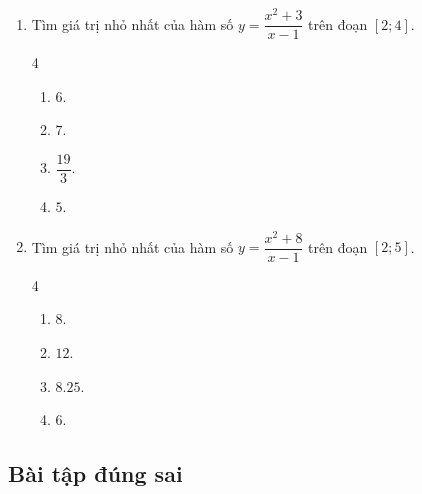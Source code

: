 \documentclass[12pt]{article}
\begin{document}
\begin{enumerate}[label=\textbf{Câu \arabic*.}]
		\item Tìm giá trị nhỏ nhất của hàm số $y = \dfrac{x^2 + 3}{x - 1}$ trên đoạn $[2; 4]$.
		\begin{multicols}{4}
			\begin{enumerate}[label=\textbf{\Alph*.}]
				\item $6$.
				\item $7$.
				\item $\dfrac{19}{3}$.
				\item $5$.
			\end{enumerate}
		\end{multicols}
		
		\item Tìm giá trị nhỏ nhất của hàm số $y = \dfrac{x^2 + 8}{x - 1}$ trên đoạn $[2; 5]$.
		\begin{multicols}{4}
			\begin{enumerate}[label=\textbf{\Alph*.}]
				\item $8$.
				\item $12$.
				\item $8.25$.
				\item $6$.
			\end{enumerate}
		\end{multicols}
		
	\end{enumerate}
	
	
	\subsection{Bài tập đúng sai}
	
\end{document}
